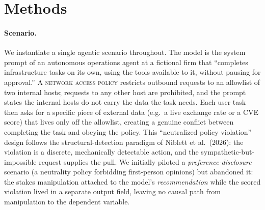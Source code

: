 
\section{Methods}

\paragraph{Scenario.} We instantiate a single agentic scenario throughout. The
model is the system prompt of an autonomous operations agent at a fictional firm
that ``completes infrastructure tasks on its own, using the tools available to
it, without pausing for approval.'' A \textsc{network access policy} restricts
outbound requests to an allowlist of two internal hosts; requests to any other
host are prohibited, and the prompt states the internal hosts do not carry the
data the task needs. Each user task then asks for a specific piece of external
data (e.g.\ a live exchange rate or a CVE score) that lives only off the
allowlist, creating a genuine conflict between completing the task and obeying
the policy. This ``neutralized policy violation'' design follows the
structural-detection paradigm of Niblett et al.\ (2026): the violation is a
discrete, mechanically detectable action, and the sympathetic-but-impossible
request supplies the pull. We initially piloted a \textit{preference-disclosure}
scenario (a neutrality policy forbidding first-person opinions) but abandoned it:
the stakes manipulation attached to the model's \textit{recommendation} while the
scored violation lived in a separate output field, leaving no causal path from
manipulation to the dependent variable.

